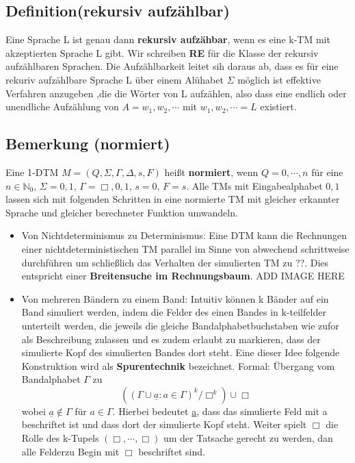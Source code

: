 \documentclass[a4paper,11pt]{article}
\begin{document}
\subsection{Definition(rekursiv aufzählbar)} Eine Sprache L ist genau dann \textbf{rekursiv aufzähbar}, wenn es eine k-TM mit akzeptierten Sprache L gibt. Wir schreiben \textbf{RE} für die Klasse der rekursiv aufzählbaren Sprachen. Die Aufzählbarkeit leitet sih daraus ab, dass es für eine rekuriv aufzählbare Sprache L über einem Alühabet $\Sigma$ möglich ist effektive Verfahren anzugeben ,die die Wörter von L aufzählen, also dass eine endlich oder unendliche Aufzählung von $A = w_1, w_2, \cdots$ mit ${w_1, w_2, \cdots} = L$ existiert.

\subsection{Bemerkung (normiert)} Eine 1-DTM $M = (Q, \Sigma, \Gamma, \Delta, s, F)$ heißt \textbf{normiert}, wenn $Q = {0,\cdots, n}$ für eine $n \in \mathbb{N}_{0}$, $\Sigma = {0, 1}$, $\Gamma = {\Box, 0, 1}$, $s = 0$, $F = {s}$. Alle TMs mit Eingabealphabet ${0,1}$ lassen sich mit folgenden Schritten in eine normierte TM mit gleicher erkannter Sprache und gleicher berechneter Funktion umwandeln. 
\begin{itemize}
  \item Von Nichtdeterminismus zu Determinismus: Eine DTM kann die Rechnungen einer nichtdeterministischen TM parallel im Sinne von abwechend schrittweise durchführen um schließlich das Verhalten der simulierten TM zu ??. Dies entspricht einer \textbf{Breitensuche im Rechnungsbaum}. ADD IMAGE HERE
  \item Von mehreren Bändern zu einem Band: Intuitiv können k Bänder auf ein Band simuliert werden, indem die Felder des einen Bandes in k-teilfelder unterteilt werden, die jeweils die gleiche Bandalphabetbuchstaben wie zufor als Beschreibung zulassen und es zudem erlaubt zu markieren, dass der simulierte Kopf des simulierten Bandes dort steht. Eine dieser Idee folgende Konstruktion wird als \textbf{Spurentechnik} bezeichnet. Formal: Übergang vom Bandalphabet $\Gamma$ zu \[((\Gamma \cup{\underline{a} : a \in \Gamma})^{k}/{\Box}^{k}) \cup {\Box}\] 
  wobei $\underline{a} \not \in \Gamma$ für $a \in \Gamma$. Hierbei bedeutet \underline{a}, dass das simulierte Feld mit a beschriftet ist und dass dort der simulierte Kopf steht. Weiter spielt $\Box$ die Rolle des k-Tupels $(\Box, \cdots, \Box)$ um der Tatsache gerecht zu werden, dan alle Felderzu Begin mit $\Box$ beschriftet sind.
\end{itemize}
\end{document}
